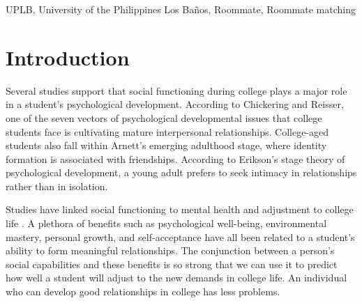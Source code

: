 \documentclass[journal]{./IEEE/IEEEtran}
\title{\SPTITLE}
\author{\ADVISEE~and~\ADVISER%
\REMARK
}
\newcommand{\UPLB}{University of the Philippines Los Ba\~{n}os }
\begin{document}
\maketitle

\begin{abstract}
This article explores the role and significance of roommates in a college student's development - from the initial adaptation with the roommate setting, to his/her academic performance and life after college. We highlight the importance of finding the proper roommates so that a student can maximize his/her psychological development, get higher grades, and develop open-mindedness. We also propose a solution in the form of a web application that can help \UPLB students find mutually beneficial roommates for their college life. This solution also extends itself to solve the dorm-finding problem students experience at the start of every semester.
\end{abstract}

\begin{keywords}
UPLB, University of the Philippines Los Ba\~{n}os, Roommate, Roommate matching
\end{keywords}

\section{Introduction}

Several studies support that social functioning during college plays a major role in a student's psychological development. According to Chickering and Reisser, one of the seven vectors of psychological developmental issues that college students face is cultivating mature interpersonal relationships\cite{chickering}. College-aged students also fall within Arnett's emerging adulthood stage, where identity formation is associated with friendships\cite{erb}. According to Erikson's stage theory of psychological development, a young adult prefers to seek intimacy in relationships rather than in isolation\cite{erikson}.

Studies have linked social functioning to mental health and adjustment to college life \cite{erb}. A plethora of benefits such as psychological well-being, environmental mastery, personal growth, and self-acceptance have all been related to a student's ability to form meaningful relationships\cite{erb}. The conjunction between a person’s social capabilities and these benefits is so strong that we can use it to predict how well a student  will adjust to the new demands in college life. An individual who can develop good relationships in college has less problems.
\end{document}
